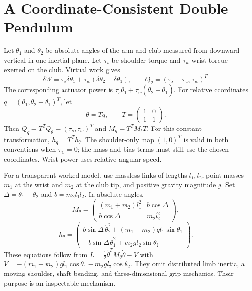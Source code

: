 \documentclass[12pt, openany]{book}
\theoremstyle{plain}
\begin{document}
\section{A Coordinate-Consistent Double Pendulum}

Let $\theta_1$ and $\theta_2$ be absolute angles of the arm and club measured
from downward vertical in one inertial plane. Let $\tau_s$ be shoulder torque
and $\tau_w$ wrist torque exerted on the club. Virtual work gives
\begin{equation}
\delta W=\tau_s\delta\theta_1+\tau_w(\delta\theta_2-\delta\theta_1),
\qquad Q_\theta=(\tau_s-\tau_w,\tau_w)^T.
\end{equation}
The corresponding actuator power is
$\tau_s\dot\theta_1+\tau_w(\dot\theta_2-\dot\theta_1)$.
For relative coordinates $q=(\theta_1,\theta_2-\theta_1)^T$, let
\begin{equation}
\theta=Tq,\qquad T=\begin{pmatrix}1&0\\1&1\end{pmatrix}.
\end{equation}
Then $Q_q=T^TQ_\theta=(\tau_s,\tau_w)^T$ and $M_q=T^TM_\theta T$.
For this constant transformation, $h_q=T^Th_\theta$. The shoulder-only map
$(1,0)^T$ is valid in both conventions when $\tau_w=0$; the mass and bias terms
must still use the chosen coordinates. Wrist power uses relative angular speed.

For a transparent worked model, use massless links of lengths $l_1,l_2$,
point masses $m_1$ at the wrist and $m_2$ at the club tip, and positive gravity
magnitude $g$. Set $\Delta=\theta_1-\theta_2$ and $b=m_2l_1l_2$. In absolute angles,
\begin{equation}
M_\theta=\begin{pmatrix}
(m_1+m_2)l_1^2&b\cos\Delta\\
b\cos\Delta&m_2l_2^2
\end{pmatrix},
\end{equation}
\begin{equation}
h_\theta=\begin{pmatrix}
b\sin\Delta\,\dot\theta_2^2+(m_1+m_2)gl_1\sin\theta_1\\
-b\sin\Delta\,\dot\theta_1^2+m_2gl_2\sin\theta_2
\end{pmatrix}.
\end{equation}
These equations follow from $L=\tfrac12\dot\theta^TM_\theta\dot\theta-V$ with
$V=-(m_1+m_2)gl_1\cos\theta_1-m_2gl_2\cos\theta_2$.
They omit distributed limb inertia, a moving shoulder, shaft bending, and
three-dimensional grip mechanics. Their purpose is an inspectable mechanism.
\end{document}
